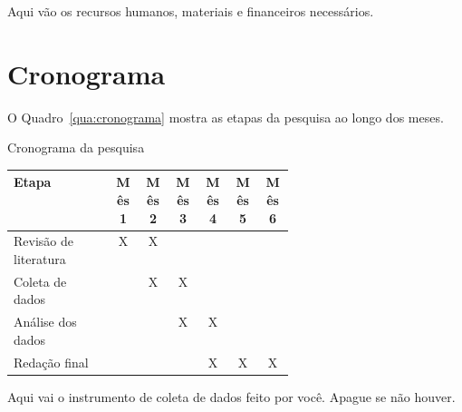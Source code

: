 \documentclass[12pt,a4paper,oneside]{article}
\begin{document}
Aqui vão os recursos humanos, materiais e financeiros necessários.

\section{Cronograma}

O Quadro~\ref{qua:cronograma} mostra as etapas da pesquisa ao longo dos meses.

\begin{quadro}[htbp]
  \begin{ilustracao}{\textwidth}
    \caption{Cronograma da pesquisa}\label{qua:cronograma}
    \centering
    \begin{tabular}{|p{0.36\linewidth}|*{6}{c|}}
      \hline
      \textbf{Etapa} & \textbf{Mês 1} & \textbf{Mês 2} & \textbf{Mês 3} & \textbf{Mês 4} & \textbf{Mês 5} & \textbf{Mês 6} \\ \hline
      Revisão de literatura & X & X &   &   &   &   \\ \hline
      Coleta de dados       &   & X & X &   &   &   \\ \hline
      Análise dos dados     &   &   & X & X &   &   \\ \hline
      Redação final         &   &   &   & X & X & X \\ \hline
    \end{tabular}
  \end{ilustracao}
\end{quadro}



Aqui vai o instrumento de coleta de dados feito por você. Apague se não houver.
\end{document}
